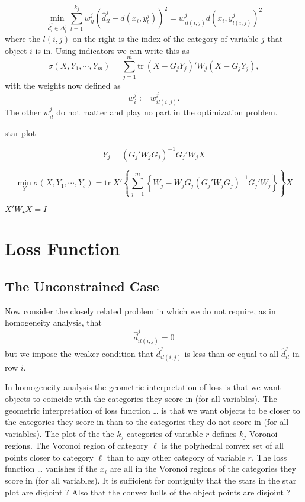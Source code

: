 \documentclass[
  12pt,
]{article}
\begin{document}
\[
\min_{\hat d_i^j\in\Delta_i^j}\sum_{l=1}^{k_j}w_{il}^j(\hat d_{il}^j-d(x_i,y_l^j))^2=w_{il(i,j)}^jd(x_i,y_{l(i,j)}^j)^2
\]
where the \(l(i,j)\) on the right is the index of the category of variable \(j\) that object \(i\) is in. Using indicators we can write this as
\[
\sigma(X,Y_1,\cdots,Y_m)=
\sum_{j=1}^m\text{tr}\ (X-G_jY_j)'W_j(X-G_jY_j),
\]
with the weights now defined as
\[
w_i^j:=w_{il(i,j)}^j.
\]
The other \(w_{il}^j\) do not matter and play no part in the optimization
problem.

star plot

\[Y_j=(G_j'W_jG_j)^{-1}G_j'W_jX\]

\[
\min_Y\sigma(X,Y_1,\cdots,Y_s)=\text{tr}\ X'\left\{\sum_{j=1}^m\left\{W_j-W_jG_j(G_j'W_jG_j)^{-1}G_j'W_j\right\}\right\}X
\]

\(X'W_\star X=I\)

\section{Loss Function}\label{loss-function}

\subsection{The Unconstrained Case}\label{the-unconstrained-case}

Now consider the closely related problem in which we do not require,
as in homogeneity analysis, that
\[
\hat d^j_{il(i,j)}=0
\]
but we impose the weaker condition that \(\hat d^j_{il(i,j)}\) is less than or equal to all \(\hat d^j_{il}\) in row \(i\).

In homogeneity analysis the geometric interpretation of loss is that we
want objects to coincide with the categories they score in (for all variables). The geometric interpretation of loss function \ldots{} is that we want
objects to be closer to the categories they score in than to the categories
they do not score in (for all variables). The plot of the the \(k_j\) categories of
variable \(r\) defines \(k_j\) Voronoi regions. The Voronoi region of
category \(\ell\) is the polyhedral convex set of all points closer to category
\(\ell\) than to any other category of variable \(r\). The loss function
\ldots{} vanishes if the \(x_i\) are all in the Voronoi regions of the categories
they score in (for all variables). It is sufficient for contiguity that the
stars in the star plot are disjoint ? Also that the convex hulls of the
object points are disjoint ?
\end{document}
